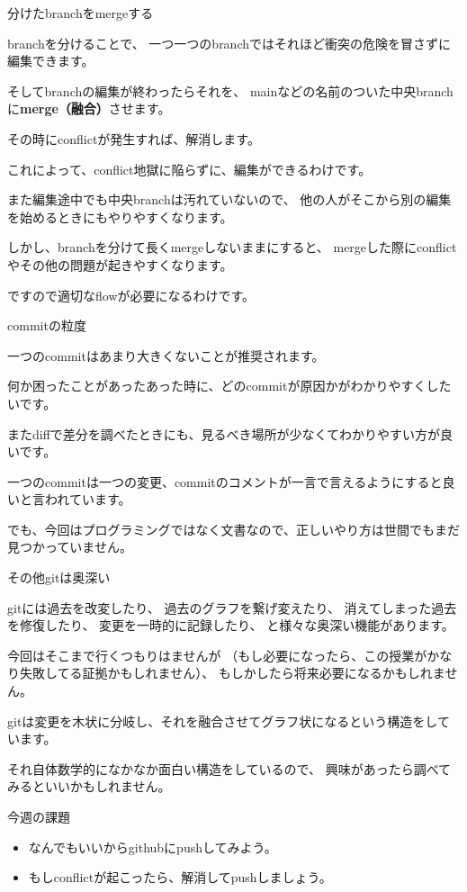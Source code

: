 \documentclass[12pt, unicode]{beamer}
\begin{document}
\begin{frame}{分けたbranchをmergeする}

branchを分けることで、
一つ一つのbranchではそれほど衝突の危険を冒さずに編集できます。

そしてbranchの編集が終わったらそれを、
mainなどの名前のついた中央branchに\textbf{merge（融合）}させます。

その時にconflictが発生すれば、解消します。

これによって、conflict地獄に陥らずに、編集ができるわけです。

また編集途中でも中央branchは汚れていないので、
他の人がそこから別の編集を始めるときにもやりやすくなります。

しかし、branchを分けて長くmergeしないままにすると、
mergeした際にconflictやその他の問題が起きやすくなります。

ですので適切なflowが必要になるわけです。

\end{frame}
\begin{frame}{commitの粒度}

一つのcommitはあまり大きくないことが推奨されます。

何か困ったことがあったあった時に、どのcommitが原因かがわかりやすくしたいです。

またdiffで差分を調べたときにも、見るべき場所が少なくてわかりやすい方が良いです。

一つのcommitは一つの変更、commitのコメントが一言で言えるようにすると良いと言われています。

でも、今回はプログラミングではなく文書なので、正しいやり方は世間でもまだ見つかっていません。

\end{frame}
\begin{frame}{その他gitは奥深い}

gitには過去を改変したり、
過去のグラフを繋げ変えたり、
消えてしまった過去を修復したり、
変更を一時的に記録したり、
と様々な奥深い機能があります。

今回はそこまで行くつもりはませんが
（もし必要になったら、この授業がかなり失敗してる証拠かもしれません）、
もしかしたら将来必要になるかもしれません。

gitは変更を木状に分岐し、それを融合させてグラフ状になるという構造をしています。

それ自体数学的になかなか面白い構造をしているので、
興味があったら調べてみるといいかもしれません。

\end{frame}

\begin{frame}{今週の課題}

\begin{itemize}
\item なんでもいいからgithubにpushしてみよう。
\item もしconflictが起こったら、解消してpushしましょう。
\end{itemize}

\end{frame}
\end{document}
